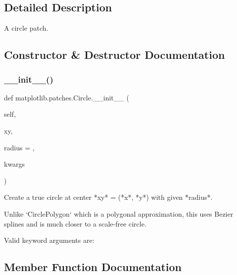 \subsection{Detailed Description}
\begin{DoxyVerb}A circle patch.\end{DoxyVerb}
 

\subsection{Constructor \& Destructor Documentation}
\mbox{\label{classmatplotlib_1_1patches_1_1Circle_a892bbc52f82ccf41d33802c3d3ba227f}} 
\subsubsection{\texorpdfstring{\+\_\+\+\_\+init\+\_\+\+\_\+()}{\_\_init\_\_()}}
{\footnotesize\ttfamily def matplotlib.\+patches.\+Circle.\+\_\+\+\_\+init\+\_\+\+\_\+ (\begin{DoxyParamCaption}\item[{}]{self,  }\item[{}]{xy,  }\item[{}]{radius = {},  }\item[{}]{kwargs }\end{DoxyParamCaption})}

\begin{DoxyVerb}Create a true circle at center *xy* = (*x*, *y*) with given *radius*.

Unlike `CirclePolygon` which is a polygonal approximation, this uses
Bezier splines and is much closer to a scale-free circle.

Valid keyword arguments are:

\end{DoxyVerb}
 

\subsection{Member Function Documentation}
\mbox{\label{classmatplotlib_1_1patches_1_1Circle_a6d4b65d0fc75ad18b08fb0121f0e68aa}} 
